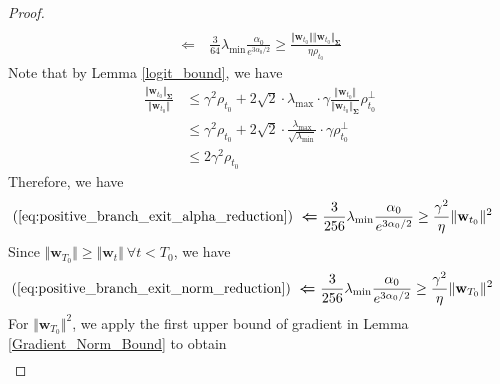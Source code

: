 \documentclass[pdflatex,sn-basic]{sn-jnl}%
\theoremstyle{thmstyleone}%
\begin{document}
\begin{appendices}
\begin{proof}
\begin{equation}
\begin{aligned}
    \\ \ \boldsymbol{\Leftarrow} \ &
    \frac{3}{64}
    \lambda_{\min}
    \frac{\alpha_0 }{e^{3 \alpha_0 / 2 }}
    \ge
    \frac{\Vert \mathbf{w}_{t_0} \Vert \Vert \mathbf{w}_{t_0} \Vert_{\mathbf{\Sigma}}}{\eta \rho_{t_0}}
  \end{aligned}
  \end{equation}
  Note that 
  by Lemma \ref{logit_bound}, we have 
  \begin{equation*}
  \begin{aligned}
    \frac{\Vert \mathbf{w}_{t_0} \Vert_{\mathbf{\Sigma}} }{\Vert \mathbf{w}_{t_0} \Vert}
    & \le 
    \gamma^2 \rho_{t_0} + 2 \sqrt{2} \cdot \lambda_{\max} \cdot \gamma \frac{\Vert \mathbf{w}_{t_0} \Vert }{\Vert \mathbf{w}_{t_0} \Vert_{\mathbf{\Sigma}}} \rho_{t_0}^{\perp}
    \\ & \le 
    \gamma^2 \rho_{t_0} + 2 \sqrt{2} \cdot \frac{\lambda_{\max}}{\sqrt{\lambda_{\min}}} \cdot \gamma \rho_{t_0}^{\perp}
    \\ & \le 
    2 \gamma^2 \rho_{t_0}
  \end{aligned}
  \end{equation*}
  Therefore, we have 
  \begin{equation}\label{eq:positive_branch_exit_norm_reduction}
  \begin{aligned}
    (\ref{eq:positive_branch_exit_alpha_reduction}) 
    \ \boldsymbol{\Leftarrow} \ &
    \frac{3}{256}
    \lambda_{\min}
    \frac{\alpha_0 }{e^{3 \alpha_0 / 2 }}
    \ge
    \frac{\gamma^2}{\eta} \Vert \mathbf{w}_{t_0} \Vert^2
  \end{aligned}
  \end{equation}
  Since $\Vert \mathbf{w}_{T_0} \Vert \ge \Vert \mathbf{w}_{t} \Vert \ \forall t < T_0$, we have 
  \begin{equation}\label{eq:positive_branch_exit_terminal_norm}
  \begin{aligned}
    (\ref{eq:positive_branch_exit_norm_reduction}) 
    \ \boldsymbol{\Leftarrow} \ &
    \frac{3}{256}
    \lambda_{\min}
    \frac{\alpha_0 }{e^{3 \alpha_0 / 2 }}
    \ge
    \frac{\gamma^2}{\eta} \Vert \mathbf{w}_{T_0} \Vert^2
  \end{aligned}
  \end{equation}
  For $\Vert \mathbf{w}_{T_0} \Vert^2$, we apply the first upper bound of gradient in Lemma \ref{Gradient_Norm_Bound} to obtain
  \begin{equation*}
  \begin{aligned}

\end{aligned}
\end{equation*}
\end{proof}
\end{appendices}
\end{document}
